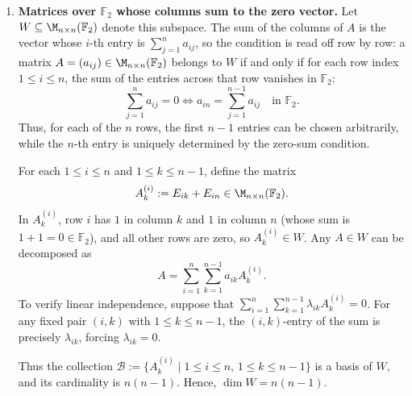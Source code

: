 \begin{exercisesolution*}
\begin{enumerate}[label=\textbf{(\alph*)}]
    Any symmetric matrix $A \in W$ satisfies
    \[
        A = \sum_{i=1}^n a_{ii} D_i + \sum_{1 \le i < j \le n} a_{ij} S_{ij}.
    \]
    To verify linear independence, suppose that
    \[
        \sum_{i=1}^n \alpha_{ii} D_i + \sum_{1 \le i < j \le n} \alpha_{ij} S_{ij} = 0.
    \]
    Examining the diagonal entries yields $\alpha_{ii} = 0$ for each $1 \le i \le n$. For $i < j$, the $(i, j)$-entry of the linear combination is $\alpha_{ij}$, which implies $\alpha_{ij} = 0$. Thus, the family
    \[
        \mathcal{B} := \{D_i \mid 1 \le i \le n\} \cup \{S_{ij} \mid 1 \le i < j \le n\}
    \]
    is linearly independent and spans $W$, so it is a basis. Its cardinality is
    \[
        n + \binom{n}{2} = n + \frac{n(n-1)}{2} = \frac{n(n+1)}{2}.
    \]
    Therefore, $\dim W = \frac{n(n+1)}{2}$.

    \item \textbf{Matrices over $\mathbb{F}_2$ whose columns sum to the zero vector.} Let $W \subseteq \M_{n \times n}(\mathbb{F}_2)$ denote this subspace. The sum of the columns of $A$ is the vector whose $i$-th entry is $\sum_{j=1}^n a_{ij}$, so the condition is read off row by row: a matrix $A = (a_{ij}) \in \M_{n \times n}(\mathbb{F}_2)$ belongs to $W$ if and only if for each row index $1 \le i \le n$, the sum of the entries across that row vanishes in $\mathbb{F}_2$:
    \[
        \sum_{j=1}^n a_{ij} = 0 \iff a_{in} = \sum_{j=1}^{n-1} a_{ij} \quad \text{in } \mathbb{F}_2.
    \]
    Thus, for each of the $n$ rows, the first $n-1$ entries can be chosen arbitrarily, while the $n$-th entry is uniquely determined by the zero-sum condition.
    
    For each $1 \le i \le n$ and $1 \le k \le n-1$, define the matrix
    \[
        A_k^{(i)} := E_{ik} + E_{in} \in \M_{n \times n}(\mathbb{F}_2).
    \]
    In $A_k^{(i)}$, row $i$ has $1$ in column $k$ and $1$ in column $n$ (whose sum is $1 + 1 = 0 \in \mathbb{F}_2$), and all other rows are zero, so $A_k^{(i)} \in W$. Any $A \in W$ can be decomposed as
    \[
        A = \sum_{i=1}^n \sum_{k=1}^{n-1} a_{ik} A_k^{(i)}.
    \]
    To verify linear independence, suppose that $\sum_{i=1}^n \sum_{k=1}^{n-1} \lambda_{ik} A_k^{(i)} = 0$. For any fixed pair $(i, k)$ with $1 \le k \le n-1$, the $(i, k)$-entry of the sum is precisely $\lambda_{ik}$, forcing $\lambda_{ik} = 0$.
    
    Thus the collection $\mathcal{B} := \{A_k^{(i)} \mid 1 \le i \le n,\, 1 \le k \le n-1\}$ is a basis of $W$, and its cardinality is $n(n-1)$. Hence, $\dim W = n(n-1)$.
\end{enumerate}
\end{exercisesolution*}


